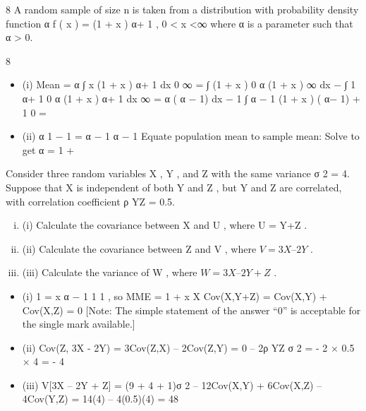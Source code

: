 \documentclass[a4paper,12pt]{article}
\begin{document}
8
A random sample of size n is taken from a distribution with probability density
function
α
f ( x ) =
(1 + x ) α+ 1
,
0 < x <∞
where α is a parameter such that α > 0.

8
\begin{itemize}
\item (i)
Mean =
α
∫ x (1 + x ) α+ 1 dx
0
∞
=
∫ (1 + x )
0
α
(1 + x )
∞
dx − ∫ 1
α+ 1
0
α
(1 + x ) α+ 1
dx
∞
=
α
( α − 1)
dx − 1
∫
α − 1 (1 + x ) ( α− 1) + 1
0
=
\item (ii)
α
1
− 1 =
α − 1
α − 1
Equate population mean to sample mean:
Solve to get α = 1 +
\end{itemize}
\newpage

Consider three random variables X , Y , and Z with the same variance σ 2 = 4. Suppose
that X is independent of both Y and Z , but Y and Z are correlated, with correlation
coefficient ρ YZ = 0.5.

\begin{enumerate}[(i)]
    \item 
(i) Calculate the covariance between X and U , where U = Y+Z . 
    \item (ii) Calculate the covariance between Z and V , where $V = 3 X – 2 Y$ . 
    \item (iii) Calculate the variance of W , where $W = 3 X – 2 Y + Z$ .



\end{enumerate}
\begin{itemize}
\item (i)
1
= x
α − 1
1
1
, so MME = 1 +
x
X
Cov(X,Y+Z) = Cov(X,Y) + Cov(X,Z) = 0
[Note: The simple statement of the answer “0” is acceptable for the single
mark available.]
\item (ii) Cov(Z, 3X - 2Y) = 3Cov(Z,X) – 2Cov(Z,Y) = 0 – 2ρ YZ σ 2
= - 2 × 0.5 × 4 = - 4

\item (iii) V[3X – 2Y + Z] = (9 + 4 + 1)σ 2 – 12Cov(X,Y) + 6Cov(X,Z) – 4Cov(Y,Z)
= 14(4) – 4(0.5)(4) = 48
\end{itemize}
\end{document}
